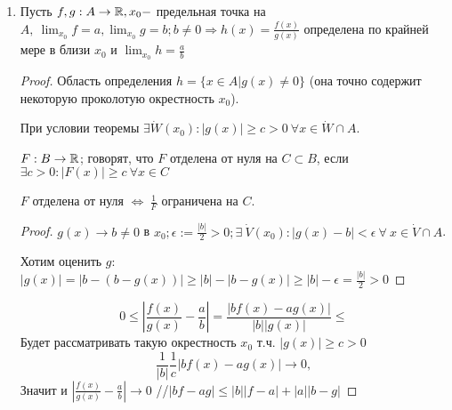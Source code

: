 \documentclass[12pt]{report}
\begin{document}
\begin{prop}
\begin{enumerate}
\item
Пусть $f, g: A \to \mathbb{R}, x_0 - $ предельная точка на $A, ~\lim_{x_0}{f} = a, \lim_{x_0}{g} = b; b \neq 0 \Rightarrow h(x) = \frac{f(x)}{g(x)}$ определена по крайней мере в близи $x_0$ и $\lim_{x_0}{h} = \frac{a}{b}$
\begin{proof}
Область определения $h = \{x \in A| g(x) \neq 0\}$ (она точно содержит некоторую проколотую окрестность $x_0$).

\begin{lm}
При условии теоремы $\exists \dot W(x_0): |g(x)| \ge c > 0 ~\forall x \in \dot W \cap A$.
\end{lm}
\begin{defn}
$F: B \to \mathbb{R}$; говорят, что $F$ отделена от нуля на $C \subset B$, если $\exists c > 0: |F(x)| \ge c ~\forall x \in C$

$F$ отделена от нуля $\Leftrightarrow ~\frac{1}{F}$ ограничена на $C$.
\end{defn}
\begin{proof}
$g(x) \to b \neq 0$ в $x_0; \epsilon := \frac{|b|}{2} > 0; \exists ~\dot V(x_0): |g(x) - b| < \epsilon ~\forall ~x \in \dot V \cap A$.

Хотим оценить $g$: $|g(x)| = |b - (b - g(x))| \ge |b| - |b - g(x)| \ge |b| - \epsilon  = \frac{|b|}{2} > 0$
\end{proof}

$$0 \le \left|\frac{f(x)}{g(x)} - \frac{a}{b}\right| = \frac{|bf(x) - ag(x)|}{|b||g(x)|} \le$$
Будет рассматривать такую окрестность $x_0$ т.ч. $|g(x)| \ge c > 0$
$$\frac{1}{|b|}\frac{1}{c}|bf(x) - ag(x)| \to 0,$$
Значит и $\left|\frac{f(x)}{g(x)} - \frac{a}{b}\right| \to 0$
//$|bf - ag| \le |b||f - a| + |a||b - g|$
\end{proof}
\end{enumerate}
\end{prop}
\end{document}
